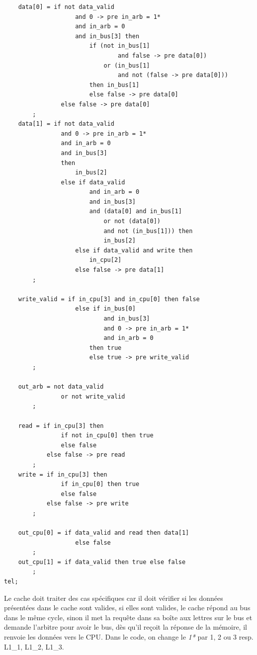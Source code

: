 \documentclass[a4paper,11pt]{report}
\begin{document}
\begin{framed}
\begin{verbatim}
    data[0] = if not data_valid
                    and 0 -> pre in_arb = 1*
                    and in_arb = 0
                    and in_bus[3] then
                        if (not in_bus[1] 
                        		and false -> pre data[0])
                            or (in_bus[1] 
                            	and not (false -> pre data[0]))
                        then in_bus[1]
                        else false -> pre data[0]
                else false -> pre data[0]
        ;
    data[1] = if not data_valid
                and 0 -> pre in_arb = 1*
                and in_arb = 0
                and in_bus[3]
                then
                    in_bus[2]
                else if data_valid
                        and in_arb = 0
                        and in_bus[3]
                        and (data[0] and in_bus[1]
                        	or not (data[0]) 
                        	and not (in_bus[1])) then
                            in_bus[2]
                    else if data_valid and write then
                        in_cpu[2]
                    else false -> pre data[1]
        ;

    write_valid = if in_cpu[3] and in_cpu[0] then false
                    else if in_bus[0]
                            and in_bus[3]
                            and 0 -> pre in_arb = 1*
                            and in_arb = 0
                        then true
                        else true -> pre write_valid
        ;

    out_arb = not data_valid
                or not write_valid
        ;

    read = if in_cpu[3] then
                if not in_cpu[0] then true
                else false
            else false -> pre read
        ;
    write = if in_cpu[3] then
                if in_cpu[0] then true
                else false
            else false -> pre write
        ;

    out_cpu[0] = if data_valid and read then data[1]
                    else false
        ;
    out_cpu[1] = if data_valid then true else false
        ;
tel;

		\end{verbatim}
	\end{framed}
	
	Le cache doit traiter des cas spécifiques car il doit vérifier si les données présentées dans le cache sont valides, si elles sont valides, le cache répond au bus dans le même cycle, sinon il met la requête dans sa boîte aux lettres sur le bus et demande l'arbitre pour avoir le bus, dès qu'il reçoit la réponse de la mémoire, il renvoie les données vers le CPU. Dans le code, on change le \emph{1*} par 1, 2 ou 3 resp. L1_1, L1_2, L1_3.
	
\end{document}
